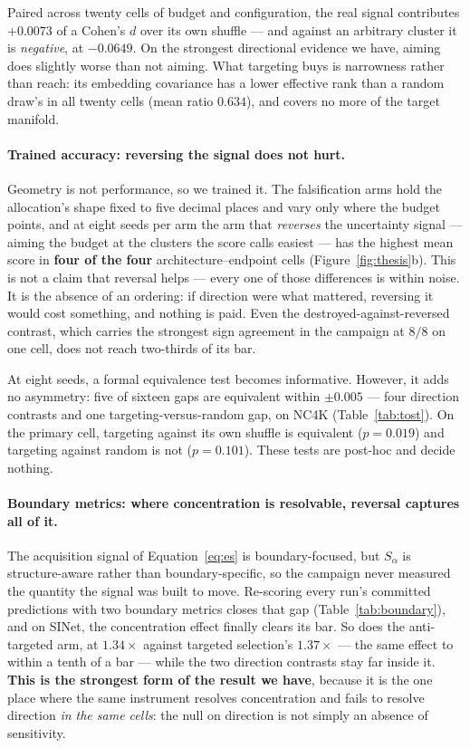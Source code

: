 \documentclass{article}
\begin{document}
Paired across twenty cells of budget and configuration, the real signal contributes $+0.0073$ of a
Cohen's $d$ over its own shuffle --- and against an arbitrary cluster it is \emph{negative}, at
$-0.0649$. On the strongest directional evidence we have, aiming does slightly worse than not
aiming. What targeting buys is narrowness rather than reach: its embedding covariance has a lower
effective rank than a random draw's in all twenty cells (mean ratio $0.634$), and covers no more of
the target manifold.

\paragraph{Trained accuracy: reversing the signal does not hurt.} Geometry is not performance, so we
trained it. The falsification arms hold the allocation's shape fixed to five decimal places and vary
only where the budget points, and at eight seeds per arm the arm that \emph{reverses} the
uncertainty signal --- aiming the budget at the clusters the score calls easiest --- has the highest
mean score in \textbf{four of the four} architecture--endpoint cells (Figure~\ref{fig:thesis}b).
This is not a claim that reversal helps --- every one of those differences is within noise. It is
the absence of an ordering: if direction were what mattered, reversing it would cost something, and
nothing is paid. Even the destroyed-against-reversed contrast, which carries the strongest sign
agreement in the campaign at $8/8$ on one cell, does not reach two-thirds of its bar.

At eight seeds, a formal equivalence test becomes informative. However, it adds no asymmetry: five of
sixteen gaps are equivalent within $\pm 0.005$ --- four direction contrasts and one
targeting-versus-random gap, on NC4K (Table~\ref{tab:tost}). On the primary cell, targeting against
its own shuffle is equivalent ($p = 0.019$) and targeting against random is not ($p = 0.101$).
These tests are post-hoc and decide nothing.

\paragraph{Boundary metrics: where concentration is resolvable, reversal captures all of it.} The
acquisition signal of Equation~\ref{eq:es} is boundary-focused, but $S_\alpha$ is structure-aware rather than boundary-specific, so the campaign never measured the quantity the signal was built to
move. Re-scoring every run's committed predictions with two boundary metrics closes that gap (Table~\ref{tab:boundary}), and on SINet, the concentration effect finally clears its bar. So does
the anti-targeted arm, at $1.34\times$ against targeted selection's $1.37\times$ --- the same effect
to within a tenth of a bar --- while the two direction contrasts stay far inside it.
\textbf{This is the strongest form of the result we have}, because it is the one place where the
same instrument resolves concentration and fails to resolve direction \emph{in the same cells}: the
null on direction is not simply an absence of sensitivity.
\end{document}
